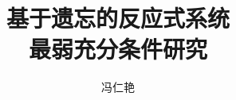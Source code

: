 \documentclass[pdftex,notypeinfo,twoside,openany,UTF8,fntef]{CASthesis}
\numberwithin{algorithm}{chapter}
\theoremstyle{THrm}{
	\newtheorem{question}{问题}[section]
    \newtheorem{problem}{问题}[section]
	\newtheorem{property}{性质}[section]
	\newtheorem{assumption}{假设}[section]
	\newtheorem{claim}[lemma]{断言}
}
\begin{document}
\newcommand{\CTL}{\textrm{CTL}}
\newcommand{\Ind}{\textrm{Ind}}
\newcommand{\Tran}{\textrm{Tran}}
\newcommand{\Sub}{\textrm{Sub}}
\newcommand{\NI}{\textrm{NI}}
\newcommand{\Inst}{\textrm{Inst}}
\newcommand{\Com}{\textrm{Com}}
\newcommand{\Rp}{\textrm{Rp}}
\newcommand{\forget}{{\textsc{f}_\CTL}}
\newcommand{\ALL}{\textsc{a}}
\newcommand{\EXIST}{\textsc{e}}
\newcommand{\NEXT}{\textsc{x}}
\newcommand{\FUTURE}{\textsc{f}}
\newcommand{\UNTILL}{\textsc{u}}
\newcommand{\GLOBAL}{\textsc{g}}
\newcommand{\UNLESS}{\textsc{w}}
\newcommand{\Def}{\textrm{def}}
\newcommand{\IR}{\textrm{IR}}
\newcommand{\Tr}{\textrm{Tr}}
\newcommand{\dis}{\textrm{dis}}
\def\PP{\ensuremath{\textbf{PP}}}
\def\NgP{\ensuremath{\textbf{NP}}}
\def\W{\ensuremath{\textbf{W}}}
\newcommand{\Pre}{\textrm{Pre}}
\newcommand{\Post}{\textrm{Post}}


\newcommand{\CTLsnf}{{\textsc{SNF}_{\textsc{ctl}}^g}}
\newcommand{\ResC}{{\textsc{R}_{\textsc{ctl}}^{\succ, S}}}
\newcommand{\CTLforget}{{\textsc{F}_{\textsc{ctl}}}}
\newcommand{\WForget}{{\textsc{WF}_{\textsc{ctl}}}}
\newcommand{\degex}{{\textsc{def}_{\textsc{ex}}}}
\newcommand{\Refine}{\textsc{Refine}}
\newcommand{\cf}{\textrm{cf.}}
\newcommand{\NEXP}{\textmd{\rm NEXP}}
\newcommand{\EXP}{\textmd{\rm EXP}}
\newcommand{\coNEXP}{\textmd{\rm co-NEXP}}
\newcommand{\NP}{\textmd{\rm NP}}
\newcommand{\coNP}{\textmd{\rm co-NP}}
\newcommand{\Pol}{\textmd{\rm P}}
\newcommand{\BH}[1]{\textmd{\rm BH}_{#1}}
\newcommand{\coBH}[1]{\textmd{\rm co-BH}_{#1}}
\newcommand{\NLOG}{\textmd{\rm NLOG}}
\newcommand{\DeltaP}[1]{\Delta_{#1}^{p}}
\newcommand{\PIP}[1]{\Pi_{#1}^{p}}
\newcommand{\SigmaP}[1]{\Sigma_{#1}^{p}}


\newcommand{\authorComment}[3]
{{\color{#1}\textbf{[\!\![\!\![\marginpar{\centering{\color{#1}\textbf{#2}}}~ #3 ]\!\!]\!\!]}}}
\newcommand{\Renyan}[1]{\textcolor{red}{#1}}
\newcommand{\Yisong}[1]{\textcolor{blue}{#1}}
\newcommand{\Wanwei}[1]{\textcolor{magenta}{#1}}


  \title{基于遗忘的反应式系统\\最弱充分条件研究}
  \author{冯仁艳}
\end{document}
